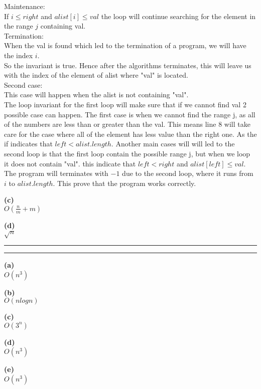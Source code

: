 \documentclass[a4paper, 11pt]{article}
\newcommand{\question}[2] {\vspace{.25in} \hrule\vspace{0.5em}
\noindent{\bf #1: #2} \vspace{0.5em}
\hrule \vspace{.10in}}
\renewcommand{\part}[1] {\vspace{.10in} {\bf (#1)}}
\begin{document}
Maintenance:\\
If $i \leq right$ and $alist[i] \leq val$ the loop will continue searching for the element in the range $j$ containing val.\\
Termination:\\
When the val is found which led to the termination of a program, we will have the index $i$.\\
So the invariant is true. Hence after the algorithms terminates, this will leave us with the index of the element of alist where "val" is located.\\
Second case:\\
This case will happen when the alist is not containing "val".\\
The loop invariant for the first loop will make sure that if we cannot find val 2 possible case can happen. The first case is when we cannot find the range j, as all of the numbers are less than or greater than the val. This means line 8 will take care for the case where all of the element has less value than the right one. As the if indicates that $left < alist.length$. Another main cases will will led to the second loop is that the first loop contain the possible range j, but when we loop it does not contain "val". this indicate that $left < right$ and $alist[left] \leq val$. The program will terminates with $-1$ due to the second loop, where it runs from $i$ to $alist.length$. This prove that the program works correctly.

\part{c}\\
$O(\frac{n}{m} + m)$

\part{d}\\
$\sqrt{n}$

\question{6}{Problem 6}
\part{a}\\
$O(n^3)$

\part{b}\\
$O(nlogn)$

\part{c}\\
$O(3^n)$

\part{d}\\
$O(n^3)$

\part{e}\\
$O(n^3)$
\end{document}
